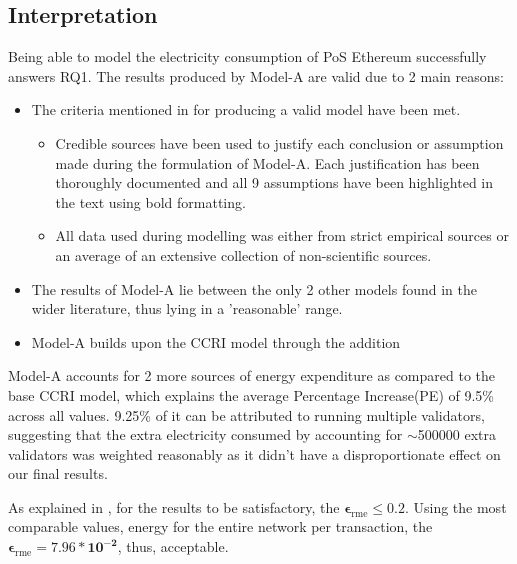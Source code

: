 \subsection{Interpretation}

Being able to model the electricity consumption of PoS Ethereum successfully answers RQ1. The results produced by Model-A are valid due to 2 main reasons:
\begin{itemize}
    \item The criteria mentioned in  for producing a valid model have been met. 
    \begin{itemize}
        \item Credible sources have been used to justify each conclusion or assumption made during the formulation of Model-A. Each justification has been thoroughly documented and all 9 assumptions have been highlighted in the text using bold formatting.
        \item All data used during modelling was either from strict empirical sources or an average of an extensive collection of non-scientific sources.
    \end{itemize}
    \item The results of Model-A lie between the only 2 other models found in the wider literature, thus lying in a 'reasonable' range.
    \item Model-A builds upon the CCRI model through the addition
\end{itemize}

Model-A accounts for 2 more sources of energy expenditure as compared to the base CCRI model, which explains the average Percentage Increase(PE) of 9.5\% across all values. 9.25\% of it can be attributed to running multiple validators, suggesting that the extra electricity consumed by accounting for $\sim$500000 extra validators was weighted reasonably as it didn't have a disproportionate effect on our final results. 

As explained in , for the results to be satisfactory, the $\boldsymbol{\epsilon_\mathrm{rme} \leq 0.2}$. Using the most comparable values, energy for the entire network per transaction, the $\boldsymbol{\epsilon_\mathrm{rme} = 7.96 * 10^{-2}}$, thus, acceptable.


